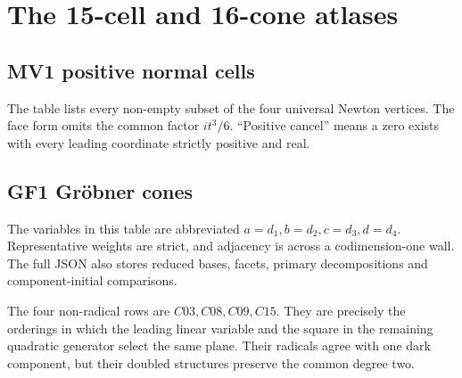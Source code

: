 \section{The 15-cell and 16-cone atlases}\label{app:atlases}

\subsection{MV1 positive normal cells}

The table lists every non-empty subset of the four universal Newton vertices.
The face form omits the common factor \(it^3/6\).  ``Positive cancel'' means a
zero exists with every leading coordinate strictly positive and real.



\subsection{GF1 Gr\"obner cones}

The variables in this table are abbreviated \(a=d_1,b=d_2,c=d_3,d=d_4\).
Representative weights are strict, and adjacency is across a codimension-one
wall.  The full JSON also stores reduced bases, facets, primary decompositions
and component-initial comparisons.



The four non-radical rows are \(C03,C08,C09,C15\).  They are precisely the
orderings in which the leading linear variable and the square in the remaining
quadratic generator select the same plane.  Their radicals agree with one dark
component, but their doubled structures preserve the common degree two.
